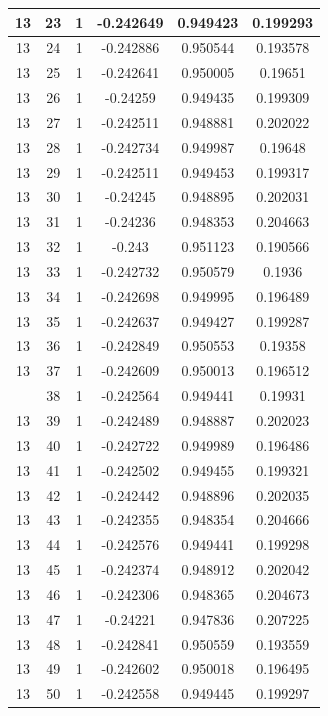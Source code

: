 \documentclass[12pt,a4paper]{article}
\numberwithin{equation}{section}
\numberwithin{figure}{section}
\numberwithin{table}{section}
\begin{document}
\begin{longtable}{|c|c|c|c|c|c|}
13 & 23 & 1 & -0.242649 & 0.949423 & 0.199293 \\ \hline
13 & 24 & 1 & -0.242886 & 0.950544 & 0.193578 \\ \hline
13 & 25 & 1 & -0.242641 & 0.950005 & 0.19651 \\ \hline
13 & 26 & 1 & -0.24259 & 0.949435 & 0.199309 \\ \hline
13 & 27 & 1 & -0.242511 & 0.948881 & 0.202022 \\ \hline
13 & 28 & 1 & -0.242734 & 0.949987 & 0.19648 \\ \hline
13 & 29 & 1 & -0.242511 & 0.949453 & 0.199317 \\ \hline
13 & 30 & 1 & -0.24245 & 0.948895 & 0.202031 \\ \hline
13 & 31 & 1 & -0.24236 & 0.948353 & 0.204663 \\ \hline
13 & 32 & 1 & -0.243 & 0.951123 & 0.190566 \\ \hline
13 & 33 & 1 & -0.242732 & 0.950579 & 0.1936 \\ \hline
13 & 34 & 1 & -0.242698 & 0.949995 & 0.196489 \\ \hline
13 & 35 & 1 & -0.242637 & 0.949427 & 0.199287 \\ \hline
13 & 36 & 1 & -0.242849 & 0.950553 & 0.19358 \\ \hline
13 & 37 & 1 & -0.242609 & 0.950013 & 0.196512 \\ \hline
\pagebreak
13 & 38 & 1 & -0.242564 & 0.949441 & 0.19931 \\ \hline
13 & 39 & 1 & -0.242489 & 0.948887 & 0.202023 \\ \hline
13 & 40 & 1 & -0.242722 & 0.949989 & 0.196486 \\ \hline
13 & 41 & 1 & -0.242502 & 0.949455 & 0.199321 \\ \hline
13 & 42 & 1 & -0.242442 & 0.948896 & 0.202035 \\ \hline
13 & 43 & 1 & -0.242355 & 0.948354 & 0.204666 \\ \hline
13 & 44 & 1 & -0.242576 & 0.949441 & 0.199298 \\ \hline
13 & 45 & 1 & -0.242374 & 0.948912 & 0.202042 \\ \hline
13 & 46 & 1 & -0.242306 & 0.948365 & 0.204673 \\ \hline
13 & 47 & 1 & -0.24221 & 0.947836 & 0.207225 \\ \hline
13 & 48 & 1 & -0.242841 & 0.950559 & 0.193559 \\ \hline
13 & 49 & 1 & -0.242602 & 0.950018 & 0.196495 \\ \hline
13 & 50 & 1 & -0.242558 & 0.949445 & 0.199297 \\ \hline

\end{longtable}
\end{document}
